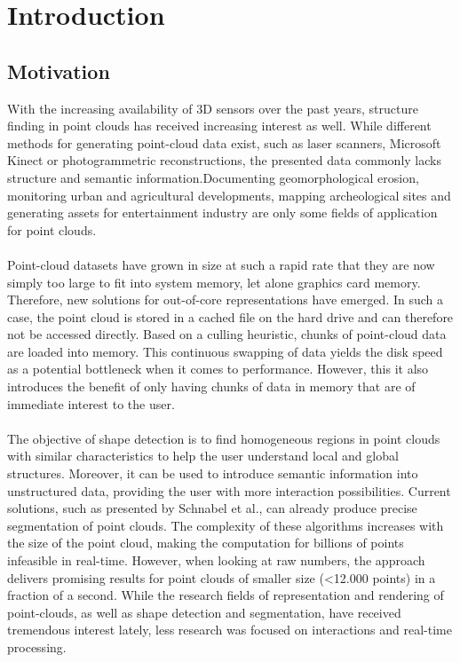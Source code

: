 \chapter{Introduction}
\newpage

\section{Motivation}

With the increasing availability of 3D sensors over the past years, structure finding in point clouds has received increasing interest as well. While different methods for generating point-cloud data exist, such as laser scanners, Microsoft Kinect or photogrammetric reconstructions, the presented data commonly lacks structure and semantic information.Documenting geomorphological erosion, monitoring urban and agricultural developments, mapping archeological sites and generating assets for entertainment industry are only some fields of application for point clouds. 
\\
\\
Point-cloud datasets have grown in size at such a rapid rate that they are now simply too large to fit into system memory, let alone graphics card memory. Therefore, new solutions for out-of-core representations have emerged. In such a case, the point cloud is stored in a cached file on the hard drive and can therefore not be accessed directly. Based on a culling heuristic, chunks of point-cloud data are loaded into memory. This continuous swapping of data yields the disk speed as a potential bottleneck when it comes to performance. However, this it also introduces the benefit of only having chunks of data in memory that are of immediate interest to the user. 
\\
\\
The objective of shape detection is to find homogeneous regions in point clouds with similar characteristics to help the user understand local and global structures. Moreover, it can be used to introduce semantic information into unstructured data, providing the user with more interaction possibilities. Current solutions, such as presented by Schnabel et al.\cite{schnabel-2007-efficient}\cite{schnabel-2007-ransac}, can already produce precise segmentation of point clouds. The complexity of these algorithms increases with the size of the point cloud, making the computation for billions of points infeasible in real-time. However, when looking at raw numbers, the approach delivers promising results for point clouds of smaller size (<12.000 points) in a fraction of a second.
While the research fields of representation and rendering of point-clouds, as well as shape detection and segmentation,  have received tremendous interest lately, less research was focused on interactions and real-time processing. 

